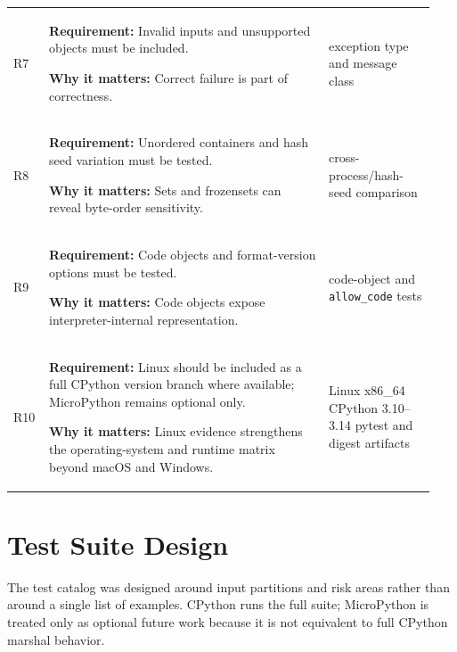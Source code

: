 \documentclass[10pt,a4paper]{article}
\begin{document}
\begin{longtable}{@{}L{0.07\linewidth}L{0.63\linewidth}L{0.24\linewidth}@{}}
R7 &
\textbf{Requirement:} Invalid inputs and unsupported objects must be included.

\textbf{Why it matters:} Correct failure is part of correctness. &
exception type and message class \\

R8 &
\textbf{Requirement:} Unordered containers and hash seed variation must be tested.

\textbf{Why it matters:} Sets and frozensets can reveal byte-order sensitivity. &
cross-process/hash-seed comparison \\

R9 &
\textbf{Requirement:} Code objects and format-version options must be tested.

\textbf{Why it matters:} Code objects expose interpreter-internal representation. &
code-object and \texttt{allow\_code} tests \\

R10 &
\textbf{Requirement:} Linux should be included as a full CPython version branch where available; MicroPython remains optional only.

\textbf{Why it matters:} Linux evidence strengthens the operating-system and runtime matrix beyond macOS and Windows. &
Linux x86\_64 CPython 3.10--3.14 pytest and digest artifacts \\

\bottomrule
\end{longtable}
\endgroup

\section{Test Suite Design}

The test catalog was designed around input partitions and risk areas rather than around a single list of examples. CPython runs the full suite; MicroPython is treated only as optional future work because it is not equivalent to full CPython marshal behavior.

\begingroup
\normalsize
\setlength{\tabcolsep}{6pt}
\renewcommand{\arraystretch}{1.18}
\end{document}
